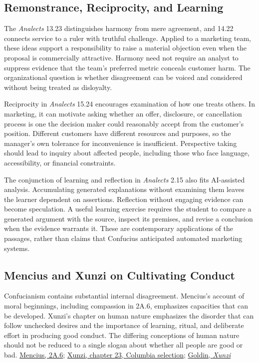 \hypertarget{M09-remonstrance-reciprocity-and-learning}{%
\subsection{Remonstrance, Reciprocity, and
Learning}\label{M09-remonstrance-reciprocity-and-learning}}

\noindent \noindent The \emph{Analects} 13.23 distinguishes harmony from mere
agreement, and 14.22 connects service to a ruler with truthful
challenge. Applied to a marketing team, these ideas support a
responsibility to raise a material objection even when the proposal is
commercially attractive. Harmony need not require an analyst to suppress
evidence that the team's preferred metric conceals customer harm. The
organizational question is whether disagreement can be voiced and
considered without being treated as disloyalty.

Reciprocity in \emph{Analects} 15.24 encourages examination of how one
treats others. In marketing, it can motivate asking whether an offer,
disclosure, or cancellation process is one the decision maker could
reasonably accept from the customer's position. Different customers have
different resources and purposes, so the manager's own tolerance for
inconvenience is insufficient. Perspective taking should lead to inquiry
about affected people, including those who face language, accessibility,
or financial constraints.

The conjunction of learning and reflection in \emph{Analects} 2.15 also
fits AI-assisted analysis. Accumulating generated explanations without
examining them leaves the learner dependent on assertions. Reflection
without engaging evidence can become speculation. A useful learning
exercise requires the student to compare a generated argument with the
source, inspect its premises, and revise a conclusion when the evidence
warrants it. These are contemporary applications of the passages, rather
than claims that Confucius anticipated automated marketing systems.

\hypertarget{M09-mencius-and-xunzi-on-cultivating-conduct}{%
\subsection{Mencius and Xunzi on Cultivating
Conduct}\label{M09-mencius-and-xunzi-on-cultivating-conduct}}

\noindent \noindent Confucianism contains substantial internal disagreement.
Mencius's account of moral beginnings, including compassion in 2A.6,
emphasizes capacities that can be developed. Xunzi's chapter on human
nature emphasizes the disorder that can follow unchecked desires and the
importance of learning, ritual, and deliberate effort in producing good
conduct. The differing conceptions of human nature should not be reduced
to a single slogan about whether all people are good or bad.
\href{https://scholarworks.iu.edu/iuswrrest/api/core/bitstreams/265d73a0-6bfa-45df-92ff-4e7d3f8be4b1/content}{Mencius,
2A.6};
\href{https://afe.easia.columbia.edu/main_pop/ps/ps_china-xunzi-human-nature.htm}{Xunzi,
chapter 23, Columbia selection};
\href{https://plato.stanford.edu/entries/xunzi/}{Goldin, \emph{Xunzi}}

